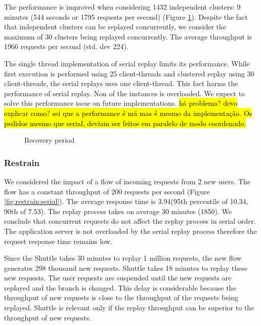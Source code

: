 The performance is improved when considering 1432 independent clusters: 9 minutes (544 seconds or 1795 requests per second) (Figure \ref{fig:recovery_period}). Despite the fact that independent clusters can be replayed concurrently, we consider the maximum of 30 clusters being replayed concurrently. The average throughput is 1966 requests per second (std. dev 224).

The single thread implementation of serial replay limits its performance. While first execution is performed using 25 client-threads and clustered replay using 30 client-threads, the serial replays uses one client-thread. This fact harms the performance of serial replay. Non of the instances is overloaded. We expect to solve this performance issue on future implementations. \hl{há problema? devo explicar como? sei que a performance é má mas é mesmo da implementação. Os pedidos mesmo que serial, deviam ser feitos em paralelo de modo coordenado.}
    
\begin{figure}[!htb] 
    \centering
    \resizebox{0.7\linewidth}{!}{}
    \caption{Recovery period}
    \label{fig:recovery_period}
\end{figure}




\subsubsection{Restrain}\label{sec:eval:recovery:restrain}
We considered the impact of a flow of incoming requests from 2 new users. The flow has a constant throughput of 200 requests per second (Figure \ref{fig:restrain:serial}). The average response time is 3.94\ms (95th percentile of 10.34\ms, 90th of 7.53\ms). The replay process takes on average 30 minutes (1850\ms). We conclude that concurrent requests do not affect the replay process in serial order. The application server is not overloaded by the serial replay process therefore the request response time remains low. 

Since the Shuttle takes 30 minutes to replay 1 million requests, the new flow generates 298 thousand new requests. Shuttle takes 18 minutes to replay these new requests. The user requests are suspended until the new requests are replayed and the branch is changed.  This delay is considerable because the throughput of new requests is close to the throughput of the requests being replayed. Shuttle is relevant only if the replay throughput can be superior to the throughput of new requests.

